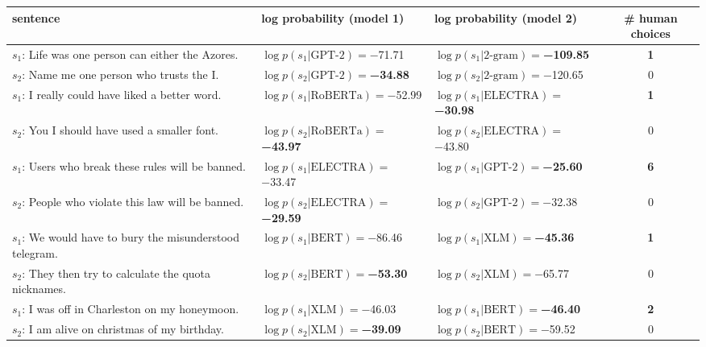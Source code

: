 \begin{tabularx}{\textwidth}{lllc}
\toprule
                                                         sentence &                               log probability (model 1) &                               log probability (model 2) &  \# human choices \\
\midrule
                $s_1$: Life was one person can either the Azores. &             $\log p(s_1 | \textrm{GPT-2})=$\num{-71.71} &  $\log p(s_1 | \textrm{2-gram})=$\textbf{\num{-109.85}} &  \textbf{\num{1}} \\
                      $s_2$: Name me one person who trusts the I. &    $\log p(s_2 | \textrm{GPT-2})=$\textbf{\num{-34.88}} &           $\log p(s_2 | \textrm{2-gram})=$\num{-120.65} &           \num{0} \\\midrule
                  $s_1$: I really could have liked a better word. &           $\log p(s_1 | \textrm{RoBERTa})=$\num{-52.99} &  $\log p(s_1 | \textrm{ELECTRA})=$\textbf{\num{-30.98}} &  \textbf{\num{1}} \\
                    $s_2$: You I should have used a smaller font. &  $\log p(s_2 | \textrm{RoBERTa})=$\textbf{\num{-43.97}} &           $\log p(s_2 | \textrm{ELECTRA})=$\num{-43.80} &           \num{0} \\\midrule
               $s_1$: Users who break these rules will be banned. &           $\log p(s_1 | \textrm{ELECTRA})=$\num{-33.47} &    $\log p(s_1 | \textrm{GPT-2})=$\textbf{\num{-25.60}} &  \textbf{\num{6}} \\
               $s_2$: People who violate this law will be banned. &  $\log p(s_2 | \textrm{ELECTRA})=$\textbf{\num{-29.59}} &             $\log p(s_2 | \textrm{GPT-2})=$\num{-32.38} &           \num{0} \\\midrule
         $s_1$: We would have to bury the misunderstood telegram. &              $\log p(s_1 | \textrm{BERT})=$\num{-86.46} &      $\log p(s_1 | \textrm{XLM})=$\textbf{\num{-45.36}} &  \textbf{\num{1}} \\
           $s_2$: They then try to calculate the quota nicknames. &     $\log p(s_2 | \textrm{BERT})=$\textbf{\num{-53.30}} &               $\log p(s_2 | \textrm{XLM})=$\num{-65.77} &           \num{0} \\\midrule
                  $s_1$: I was off in Charleston on my honeymoon. &               $\log p(s_1 | \textrm{XLM})=$\num{-46.03} &     $\log p(s_1 | \textrm{BERT})=$\textbf{\num{-46.40}} &  \textbf{\num{2}} \\
                   $s_2$: I am alive on christmas of my birthday. &      $\log p(s_2 | \textrm{XLM})=$\textbf{\num{-39.09}} &              $\log p(s_2 | \textrm{BERT})=$\num{-59.52} &           \num{0} \\\midrule

\end{tabularx}
